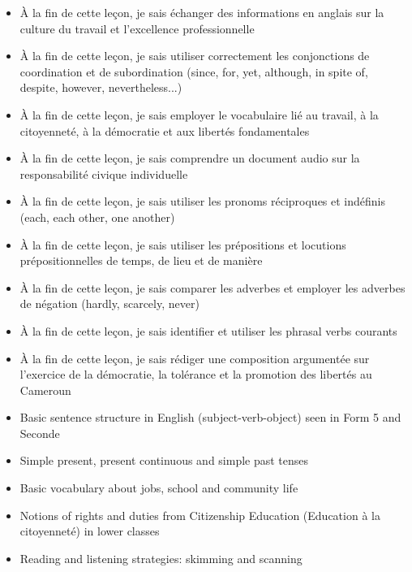 \documentclass[11pt]{article}
\begin{document}
\begin{objectifs}
\begin{itemize}
\item À la fin de cette leçon, je sais échanger des informations en anglais sur la culture du travail et l'excellence professionnelle
\item À la fin de cette leçon, je sais utiliser correctement les conjonctions de coordination et de subordination (since, for, yet, although, in spite of, despite, however, nevertheless...)
\item À la fin de cette leçon, je sais employer le vocabulaire lié au travail, à la citoyenneté, à la démocratie et aux libertés fondamentales
\item À la fin de cette leçon, je sais comprendre un document audio sur la responsabilité civique individuelle
\item À la fin de cette leçon, je sais utiliser les pronoms réciproques et indéfinis (each, each other, one another)
\item À la fin de cette leçon, je sais utiliser les prépositions et locutions prépositionnelles de temps, de lieu et de manière
\item À la fin de cette leçon, je sais comparer les adverbes et employer les adverbes de négation (hardly, scarcely, never)
\item À la fin de cette leçon, je sais identifier et utiliser les phrasal verbs courants
\item À la fin de cette leçon, je sais rédiger une composition argumentée sur l'exercice de la démocratie, la tolérance et la promotion des libertés au Cameroun
\end{itemize}
\end{objectifs}

\begin{prerequis}
\begin{itemize}
\item Basic sentence structure in English (subject-verb-object) seen in Form 5 and Seconde
\item Simple present, present continuous and simple past tenses
\item Basic vocabulary about jobs, school and community life
\item Notions of rights and duties from Citizenship Education (Education à la citoyenneté) in lower classes
\item Reading and listening strategies: skimming and scanning
\end{itemize}
\end{prerequis}
\end{document}
